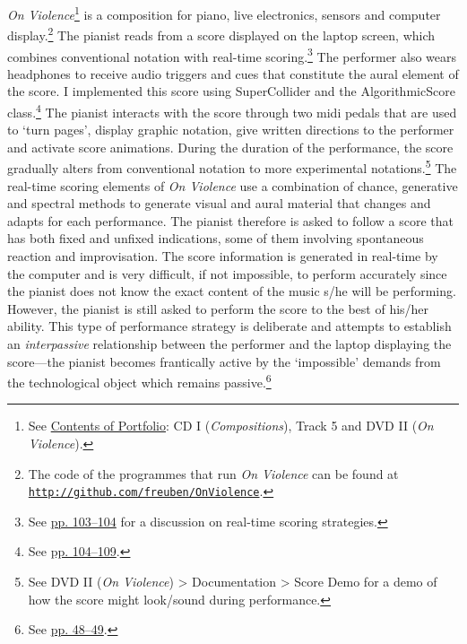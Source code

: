 \emph{On Violence}\footnote{See \hyperlink{portfolio}{Contents of Portfolio}: CD I (\emph{Compositions}), Track 5 and DVD II (\emph{On Violence}).} is a composition for piano, live electronics, sensors and computer display.\footnote{The code of the programmes that run \emph{On Violence} can be found at \href{http://github.com/freuben/OnViolence}{\texttt {http://github.com/freuben/OnViolence}}.} The pianist reads from a score displayed on the laptop screen, which combines conventional notation with real-time scoring.\footnote{See \hyperlink{realtimescore}{pp. 103--104} for a discussion on real-time scoring strategies.} The performer also wears headphones to receive audio triggers and cues that constitute the aural element of the score. I implemented this score using SuperCollider and the AlgorithmicScore class.\footnote{See \hyperlink{algoscore}{pp. 104--109}.} The pianist interacts with the score through two midi pedals that are used to `turn pages', display graphic notation, give written directions to the performer and activate score animations. During the duration of the performance, the score gradually alters from conventional notation to more experimental notations.\footnote{See DVD II (\emph{On Violence}) \tiny \textgreater \footnotesize \hspace{0pt} Documentation \tiny \textgreater \footnotesize \hspace{0pt} Score Demo for a demo of how the score might look/sound during performance.} The real-time scoring elements of \emph{On Violence} use a combination of chance, generative and spectral methods to generate visual and aural material that changes and adapts for each performance. The pianist therefore is asked to follow a score that has both fixed and unfixed indications, some of them involving spontaneous reaction and improvisation. The score information is generated in real-time by the computer and is very difficult, if not impossible, to perform accurately since the pianist does not know the exact content of the music s/he will be performing. However, the pianist is still asked to perform the score to the best of his/her ability. This type of performance strategy is deliberate and attempts to establish an \emph{interpassive} relationship between the performer and the laptop displaying the score---the pianist becomes frantically active by the `impossible' demands from the technological object which remains passive.\footnote{See \hyperlink{zizekinterpassiv}{pp. 48--49}.}


